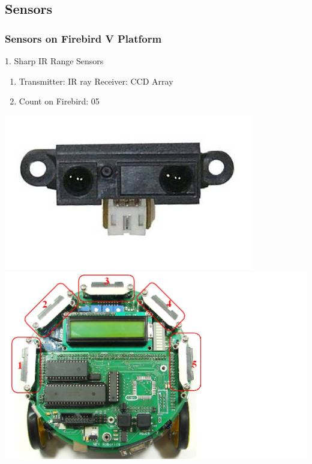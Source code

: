 \documentclass[10pt,red]{beamer}
\begin{document}
\subsection{Sensors}
\begin{frame}
	\frametitle{Sensors on Firebird V Platform} 
	1. Sharp IR Range Sensors	\pause
		\vfill
		\begin{minipage}[c]{0.5\textwidth}
			\begin{enumerate}
				\item <+-|alert@+> Transmitter: IR ray \qquad Receiver: CCD Array \\[10pt]
				\item <+-|alert@+> Count on Firebird: 05
			\end{enumerate}
		\end{minipage}
		\hfill
		\begin{minipage}[c]{0.4\textwidth}
			\includegraphics[width=0.8\linewidth]{ir_sharp}
		\vfill
			\includegraphics[width=\linewidth]{sharp_on_fb}
		\end{minipage}	
\end{frame}
\end{document}
